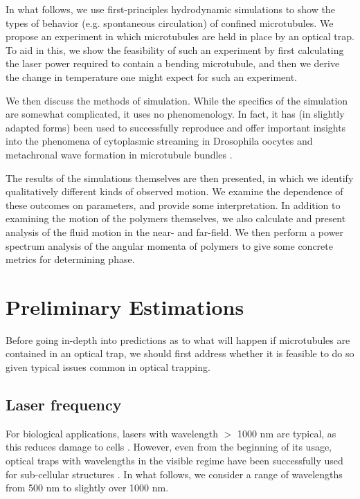 \documentclass[11pt]{ucthesis}
\begin{document}
In what follows, we use first-principles hydrodynamic simulations to show the types of behavior (e.g. spontaneous circulation) of confined microtubules. We propose an experiment in which microtubules are held in place by an optical trap. To aid in this, we show the feasibility of such an experiment by first calculating the laser power required to contain a bending microtubule, and then we derive the change in temperature one might expect for such an experiment.

We then discuss the methods of simulation. While the specifics of the simulation are somewhat complicated, it uses no phenomenology. In fact, it has (in slightly adapted forms) been used to successfully reproduce and offer important insights into the phenomena of cytoplasmic streaming in Drosophila oocytes \cite{Monteith2016} and metachronal wave formation in microtubule bundles \cite{martin2018emergence}.

The results of the simulations themselves are then presented, in which we identify qualitatively different kinds of observed motion. We examine the dependence of these outcomes on parameters, and provide some interpretation. In addition to examining the motion of the polymers themselves, we also calculate and present analysis of the fluid motion in the near- and far-field. We then perform a power spectrum analysis of the angular momenta of polymers to give some concrete metrics for determining phase.

\section{Preliminary Estimations}

Before going in-depth into predictions as to what will happen if microtubules are contained in an optical trap, we should first address whether it is feasible to do so given typical issues common in optical trapping.

\subsection{Laser frequency}

For biological applications, lasers with wavelength $>$ 1000 nm are typical, as this reduces damage to cells \cite{ashkin1987cell, stevenson2006optically}. However, even from the beginning of its usage, optical traps with wavelengths in the visible regime have been successfully used for sub-cellular structures \cite{ashkin1987virus}. In what follows, we consider a range of wavelengths from 500 nm to slightly over 1000 nm.
\end{document}
